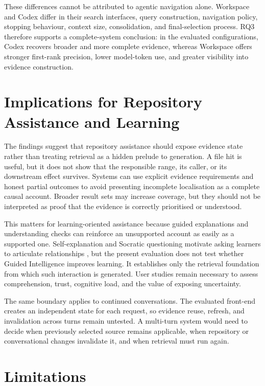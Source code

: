 These differences cannot be attributed to agentic navigation alone. Workspace and Codex differ in their search interfaces, query construction, navigation policy, stopping behaviour, context size, consolidation, and final-selection process. RQ3 therefore supports a complete-system conclusion: in the evaluated configurations, Codex recovers broader and more complete evidence, whereas Workspace offers stronger first-rank precision, lower model-token use, and greater visibility into evidence construction.

\section{Implications for Repository Assistance and Learning}\label{sec:implications-for-repository-assistance-and-learning}

The findings suggest that repository assistance should expose evidence state rather than treating retrieval as a hidden prelude to generation. A file hit is useful, but it does not show that the responsible range, its caller, or its downstream effect survives. Systems can use explicit evidence requirements and honest partial outcomes to avoid presenting incomplete localisation as a complete causal account. Broader result sets may increase coverage, but they should not be interpreted as proof that the evidence is correctly prioritised or understood.

This matters for learning-oriented assistance because guided explanations and understanding checks can reinforce an unsupported account as easily as a supported one. Self-explanation and Socratic questioning motivate asking learners to articulate relationships \textcite{Bisra2018SelfExplanation,Tamang2021Socratic}, but the present evaluation does not test whether Guided Intelligence improves learning. It establishes only the retrieval foundation from which such interaction is generated. User studies remain necessary to assess comprehension, trust, cognitive load, and the value of exposing uncertainty.

The same boundary applies to continued conversations. The evaluated front-end creates an independent state for each request, so evidence reuse, refresh, and invalidation across turns remain untested. A multi-turn system would need to decide when previously selected source remains applicable, when repository or conversational changes invalidate it, and when retrieval must run again.

\section{Limitations}\label{sec:limitations}

